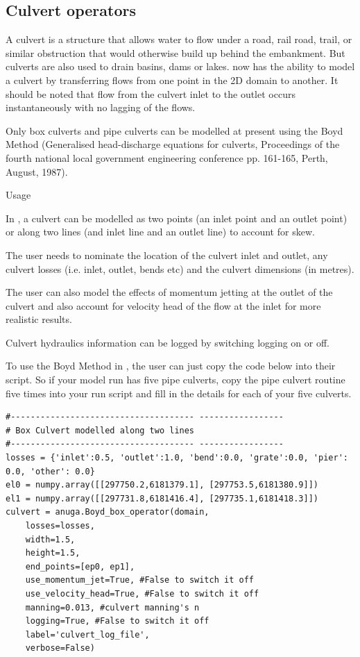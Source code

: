 \documentclass{manual}
\begin{document}
\subsection{Culvert operators}

A culvert is a structure that allows water to flow under a road, rail road, trail, or similar obstruction that would otherwise build up behind the embankment. But culverts are also used to drain basins, dams or lakes. \anuga now has the ability to model a culvert by transferring flows from one point in the 2D domain to another. It should be noted that flow from the culvert inlet to the outlet occurs instantaneously with no lagging of the flows.

Only box culverts and pipe culverts can be modelled at present using the Boyd Method (Generalised head-discharge equations for culverts, Proceedings of the fourth national local government engineering conference pp. 161-165, Perth, August, 1987).

Usage

In \anuga, a culvert can be modelled as two points (an inlet point and an outlet point) or along two lines (and inlet line and an outlet line) to account for skew.

The user needs to nominate the location of the culvert inlet and outlet, any culvert losses (i.e. inlet, outlet, bends etc) and the culvert dimensions (in metres). 

The user can also model the effects of momentum jetting at the outlet of the culvert and also account for velocity head of the flow at the inlet for more realistic results.

Culvert hydraulics information can be logged by switching logging on or off.

To use the Boyd Method in \anuga, the user can just copy the code below into their script. So if your model run has five pipe culverts, copy the pipe culvert routine five times into your run script and fill in the details for each of your five culverts.
\begin{verbatim}
#------------------------------------- -----------------
# Box Culvert modelled along two lines 
#------------------------------------- -----------------
losses = {'inlet':0.5, 'outlet':1.0, 'bend':0.0, 'grate':0.0, 'pier': 0.0, 'other': 0.0} 
el0 = numpy.array([[297750.2,6181379.1], [297753.5,6181380.9]]) 
el1 = numpy.array([[297731.8,6181416.4], [297735.1,6181418.3]])  
culvert = anuga.Boyd_box_operator(domain, 
    losses=losses, 
    width=1.5, 
    height=1.5, 
    end_points=[ep0, ep1], 
    use_momentum_jet=True, #False to switch it off
    use_velocity_head=True, #False to switch it off
    manning=0.013, #culvert manning's n
    logging=True, #False to switch it off
    label='culvert_log_file', 
    verbose=False)  
\end{verbatim}
\end{document}
